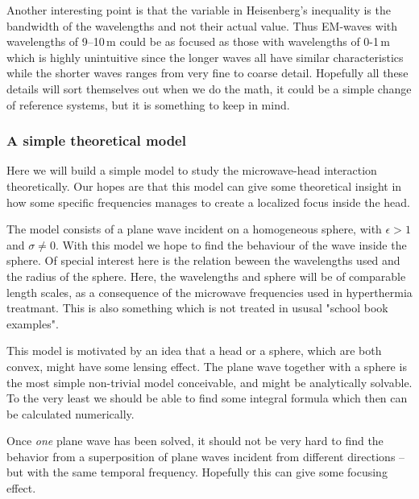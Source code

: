 \documentclass[11pt,a4paper, 
english, swedish %
]{article}
\begin{document}

Another interesting point is that the variable in Heisenberg's inequality is the bandwidth of the wavelengths and not their actual value. Thus EM-waves with wavelengths of 9--10\,m could be as focused as those with wavelengths of 0-1\,m which is highly unintuitive since the longer waves all have similar characteristics while the shorter waves ranges from very fine to coarse detail. Hopefully all these details will sort themselves out when we do the math, it could be a simple change of reference systems, but it is something to keep in mind.



\subsubsection{A simple theoretical model} %
Here we will build a simple model to study the microwave-head interaction theoretically. Our hopes are that this model can give some theoretical insight in how some specific frequencies manages to create a localized focus inside the head. 

The model consists of a plane wave incident on a homogeneous sphere, with $\epsilon>1$ and $\sigma\neq0$. With this model we hope to find the behaviour of the wave inside the sphere. Of special interest here is the relation beween the wavelengths used and the radius of the sphere. Here, the wavelengths and sphere will be of comparable length scales, as a consequence of the microwave frequencies used in hyperthermia treatmant. This is also something which is not treated in ususal "school book examples".


This model is motivated by an idea that a head or a sphere, which are both convex, might have some lensing effect. The plane wave together with a sphere is the most simple non-trivial model conceivable, and might be analytically solvable. To the very least we should be able to find some integral formula which then can be calculated numerically.

Once \emph{one} plane wave has been solved, it should not be very hard to find the behavior from a superposition of plane waves incident from different directions -- but with the same temporal frequency. Hopefully this can give some focusing effect. 
\end{document}

